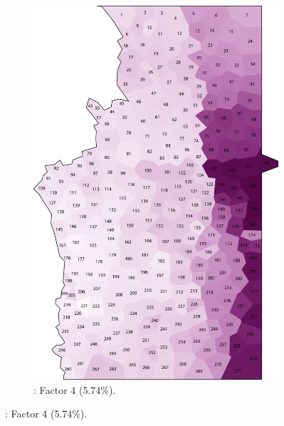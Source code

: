 \documentclass[output=paper]{LSP/langsci}
\begin{document}
\begin{figure}
\begin{subfigure}[t]{0.3\textwidth}
\includegraphics[width=\textwidth]{illustrations/pickl_fig5}
\caption{: Factor 4 (5.74\%).}
\label{fig:pickl:5}
\end{subfigure}

\vskip11pt


\end{figure}
\end{document}

